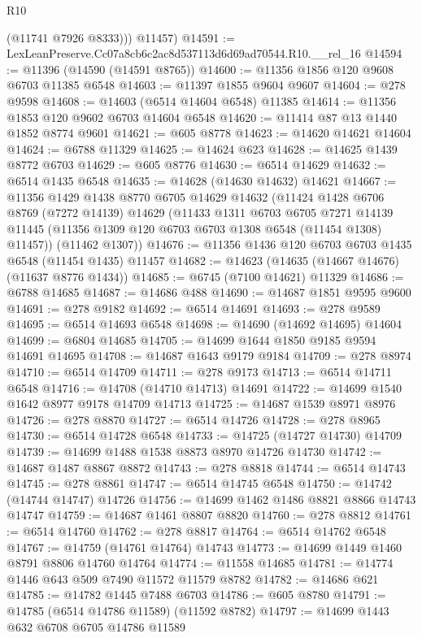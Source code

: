 \begin{lexlean}{R10}
\begin{coremodule}
          (@11741 @7926 @8333)))
      @11457)
@14591 := LexLeanPreserve.Cc07a8cb6c2ac8d537113d6d69ad70544.R10.__rel_16
@14594 := @11396 (@14590 (@14591 @8765))
@14600 := @11356 @1856 @120 @9608 @6703 @11385 @6548
@14603 := @11397 @1855 @9604 @9607
@14604 := @278 @9598
@14608 := @14603 (@6514 @14604 @6548) @11385
@14614 := @11356 @1853 @120 @9602 @6703 @14604 @6548
@14620 := @11414 @87 @13 @1440 @1852 @8774 @9601
@14621 := @605 @8778
@14623 := @14620 @14621 @14604
@14624 := @6788 @11329
@14625 := @14624 @623
@14628 := @14625 @1439 @8772 @6703
@14629 := @605 @8776
@14630 := @6514 @14629
@14632 := @6514 @1435 @6548
@14635 := @14628 (@14630 @14632) @14621
@14667 := @11356
    @1429
    @1438
    @8770
    @6705
    @14629
    @14632
    (@11424
      @1428
      @6706
      @8769
      (@7272 @14139)
      @14629
      (@11433
        @1311
        @6703
        @6705
        @7271
        @14139
        @11445
        (@11356 @1309 @120 @6703 @6703 @1308 @6548 (@11454 @1308) @11457))
      (@11462 @1307))
@14676 := @11356 @1436 @120 @6703 @6703 @1435 @6548 (@11454 @1435) @11457
@14682 := @14623 (@14635 (@14667 @14676) (@11637 @8776 @1434))
@14685 := @6745 (@7100 @14621) @11329
@14686 := @6788 @14685
@14687 := @14686 @488
@14690 := @14687 @1851 @9595 @9600
@14691 := @278 @9182
@14692 := @6514 @14691
@14693 := @278 @9589
@14695 := @6514 @14693 @6548
@14698 := @14690 (@14692 @14695) @14604
@14699 := @6804 @14685
@14705 := @14699 @1644 @1850 @9185 @9594 @14691 @14695
@14708 := @14687 @1643 @9179 @9184
@14709 := @278 @8974
@14710 := @6514 @14709
@14711 := @278 @9173
@14713 := @6514 @14711 @6548
@14716 := @14708 (@14710 @14713) @14691
@14722 := @14699 @1540 @1642 @8977 @9178 @14709 @14713
@14725 := @14687 @1539 @8971 @8976
@14726 := @278 @8870
@14727 := @6514 @14726
@14728 := @278 @8965
@14730 := @6514 @14728 @6548
@14733 := @14725 (@14727 @14730) @14709
@14739 := @14699 @1488 @1538 @8873 @8970 @14726 @14730
@14742 := @14687 @1487 @8867 @8872
@14743 := @278 @8818
@14744 := @6514 @14743
@14745 := @278 @8861
@14747 := @6514 @14745 @6548
@14750 := @14742 (@14744 @14747) @14726
@14756 := @14699 @1462 @1486 @8821 @8866 @14743 @14747
@14759 := @14687 @1461 @8807 @8820
@14760 := @278 @8812
@14761 := @6514 @14760
@14762 := @278 @8817
@14764 := @6514 @14762 @6548
@14767 := @14759 (@14761 @14764) @14743
@14773 := @14699 @1449 @1460 @8791 @8806 @14760 @14764
@14774 := @11558 @14685
@14781 := @14774 @1446 @643 @509 @7490 @11572 @11579 @8782
@14782 := @14686 @621
@14785 := @14782 @1445 @7488 @6703
@14786 := @605 @8780
@14791 := @14785 (@6514 @14786 @11589) (@11592 @8782)
@14797 := @14699 @1443 @632 @6708 @6705 @14786 @11589

\end{coremodule}
\end{lexlean}

